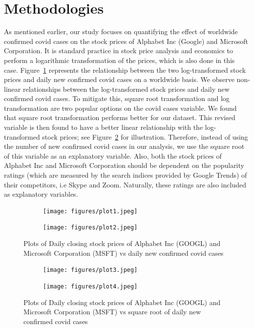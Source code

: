 \documentclass[11pt, a4paper]{article}
\begin{document}
\section{Methodologies}\label{sec:methods}

As mentioned earlier, our study focuses on quantifying the effect of worldwide confirmed covid cases on the stock prices of Alphabet Inc (Google) and Microsoft Corporation. It is standard practice in stock price analysis and economics to perform a logarithmic transformation of the prices, which is also done in this case. Figure~\ref{fig:relation1} represents the relationship between the two log-transformed stock prices and daily new confirmed covid cases on a worldwide basis. We observe non-linear relationships between the log-transformed stock prices and daily new confirmed covid cases. To mitigate this, square root transformation and log transformation are two popular options on the covid cases variable. We found that square root transformation performs better for our dataset. This revised variable is then found to have a better linear relationship with the log-transformed stock prices; see Figure~\ref{fig:relation2} for illustration. Therefore, instead of using the number of new confirmed covid cases in our analysis, we use the square root of this variable as an explanatory variable. Also, both the stock prices of Alphabet Inc and Microsoft Corporation should be dependent on the popularity ratings (which are measured by the search indices provided by Google Trends) of their competitors, i.e Skype and Zoom. Naturally, these ratings are also included as explanatory variables.


\begin{figure}[ht]
    \centering
    \begin{subfigure}{0.49\textwidth}
       \texttt{[image: figures/plot1.jpeg]}
    \end{subfigure}
    \begin{subfigure}{0.49\textwidth}
       \texttt{[image: figures/plot2.jpeg]}
    \end{subfigure}
    \caption{Plots of Daily closing stock prices of Alphabet Inc (GOOGL) and Microsoft Corporation (MSFT) vs daily new confirmed covid cases}
    \label{fig:relation1}
\end{figure}



\begin{figure}[ht]
    \centering
    \begin{subfigure}{0.49\textwidth}
       \texttt{[image: figures/plot3.jpeg]}
    \end{subfigure}
    \begin{subfigure}{0.49\textwidth}
       \texttt{[image: figures/plot4.jpeg]}
    \end{subfigure}
    \caption{Plots of Daily closing stock prices of Alphabet Inc (GOOGL) and Microsoft Corporation (MSFT) vs square root of daily new confirmed covid cases}
    \label{fig:relation2}
\end{figure}
\end{document}
